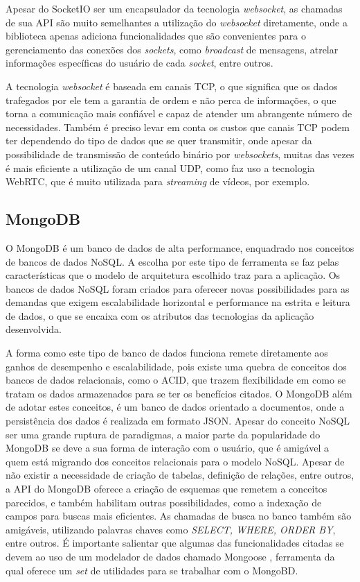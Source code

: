 Apesar do SocketIO ser um encapsulador da tecnologia \textit{websocket}, as chamadas de sua API são muito semelhantes a utilização do \textit{websocket} diretamente, onde a biblioteca apenas adiciona funcionalidades que são convenientes para o gerenciamento das conexões dos \textit{sockets}, como \textit{broadcast} de mensagens, atrelar informações específicas do usuário de cada \textit{socket}, entre outros.

A tecnologia \textit{websocket} é baseada em canais TCP, o que significa que os dados trafegados por ele tem a garantia de ordem e não perca de informações, o que torna a comunicação mais confiável e capaz de atender um abrangente número de necessidades. Também é preciso levar em conta os custos que canais TCP podem ter dependendo do tipo de dados que se quer transmitir, onde apesar da possibilidade de transmissão de conteúdo binário por \textit{websockets}, muitas das vezes é mais eficiente a utilização de um canal UDP, como faz uso a tecnologia WebRTC, que é muito utilizada para \textit{streaming} de vídeos, por exemplo.

\subsection{MongoDB}
O MongoDB é um banco de dados de alta performance, enquadrado nos conceitos de bancos de dados NoSQL. A escolha por este tipo de ferramenta se faz pelas características que o modelo de arquitetura escolhido traz para a aplicação. Os bancos de dados NoSQL foram criados para oferecer novas possibilidades para as demandas que exigem escalabilidade horizontal e performance na estrita e leitura de dados, o que se encaixa com os atributos das tecnologias da aplicação desenvolvida.

A forma como este tipo de banco de dados funciona remete diretamente aos ganhos de desempenho e escalabilidade, pois existe uma quebra de conceitos dos bancos de dados relacionais, como o ACID, que trazem flexibilidade em como se tratam os dados armazenados para se ter os benefícios citados. O MongoDB além de adotar estes conceitos, é um banco de dados orientado a documentos, onde a persistência dos dados é realizada em formato JSON. Apesar do conceito NoSQL ser uma grande ruptura de paradigmas, a maior parte da popularidade do MongoDB se deve a sua forma de interação com o usuário, que é amigável a quem está migrando dos conceitos relacionais para o modelo NoSQL. Apesar de não existir a necessidade de criação de tabelas, definição de relações, entre outros, a API do MongoDB oferece a criação de esquemas que remetem a conceitos parecidos, e também habilitam outras possibilidades, como a indexação de campos para buscas mais eficientes. As chamadas de busca no banco também são amigáveis, utilizando palavras chaves como \textit{SELECT, WHERE, ORDER BY}, entre outros. É importante salientar que algumas das funcionalidades citadas se devem ao uso de um modelador de dados chamado Mongoose \cite{mongoose}, ferramenta da qual oferece um \textit{set} de utilidades para se trabalhar com o MongoBD.
 
